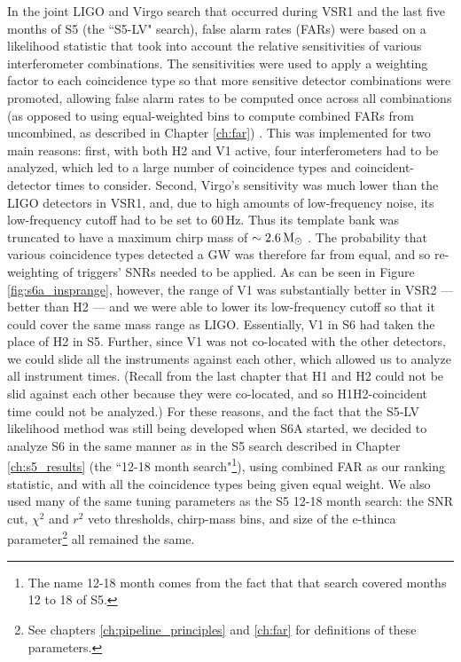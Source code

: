 In the joint LIGO and Virgo search that occurred during \ac{VSR1} and the last
five months of \ac{S5} (the ``S5-LV" search), false alarm rates (FARs) were
based on a likelihood statistic that took into account the relative
sensitivities of various interferometer combinations. The sensitivities were used
to apply a weighting factor to each coincidence type so that more sensitive
detector combinations were promoted, allowing false alarm rates to be computed
once across all combinations (as opposed to using equal-weighted bins to
compute combined \acp{FAR} from uncombined, as described in Chapter \ref{ch:far})
\cite{S5LowMassLV}. This was implemented for two main reasons: first, with both
H2 and V1 active, four interferometers had to be analyzed, which led to a large
number of coincidence types and coincident-detector times to consider. Second,
Virgo's sensitivity was much lower than the \ac{LIGO} detectors in VSR1, and,
due to high amounts of low-frequency noise, its low-frequency cutoff had to be
set to $60\,$Hz. Thus its template bank was truncated to have a maximum chirp
mass of $\sim2.6\,\mathrm{M_\odot}$ \cite{S5LowMassLV}. The probability that various
coincidence types detected a \ac{GW} was therefore far from equal, and so
re-weighting of triggers' \acp{SNR} needed to be applied. As can be seen in
Figure \ref{fig:s6a_insprange}, however, the range of V1 was substantially
better in \ac{VSR2} --- better than H2 --- and we were able to lower its
low-frequency cutoff so that it could cover the same mass range as \ac{LIGO}.
Essentially, V1 in S6 had taken the place of H2 in S5. Further, since V1 was
not co-located with the other detectors, we could slide all the instruments
against each other, which allowed us to analyze all instrument times. (Recall
from the last chapter that H1 and H2 could not be slid against each other
because they were co-located, and so H1H2-coincident time could not be
analyzed.) For these reasons, and the fact that the \ac{S5}-LV likelihood
method was still being developed when S6A started, we decided to analyze
\ac{S6} in the same manner as in the \ac{S5} search described in Chapter
\ref{ch:s5_results} (the ``12-18 month search"\footnote{The name 12-18 month
comes from the fact that that search covered months 12 to 18 of S5.}), using
combined \ac{FAR} as our ranking statistic, and with all the coincidence types
being given equal weight. We also used many of the same tuning parameters as
the \ac{S5} 12-18 month search: the \ac{SNR} cut, $\chi^2$ and $r^2$ veto
thresholds, chirp-mass bins, and size of the e-thinca parameter\footnote{See
chapters \ref{ch:pipeline_principles} and \ref{ch:far} for definitions of these
parameters.} all remained the same.

